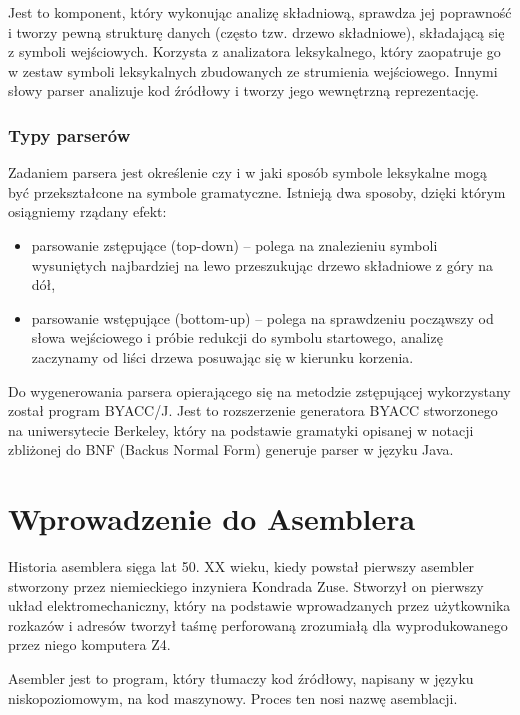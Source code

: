 \documentclass[a4paper,12pt,twoside]{article}
\begin{document}
Jest to komponent, który wykonując analizę składniową, sprawdza jej poprawność i tworzy pewną strukturę danych (często tzw. drzewo składniowe), składającą się z symboli wejściowych. Korzysta z analizatora leksykalnego, który zaopatruje go w zestaw symboli leksykalnych zbudowanych ze strumienia wejściowego. Innymi słowy parser analizuje kod źródłowy i tworzy jego wewnętrzną reprezentację.

\subsubsection{Typy parserów}

Zadaniem parsera jest określenie czy i w jaki sposób symbole leksykalne mogą być przekształcone na symbole gramatyczne. Istnieją dwa sposoby, dzięki którym osiągniemy rządany efekt:
\begin{itemize}
	\item parsowanie zstępujące (top-down) -- polega na znalezieniu symboli wysuniętych najbardziej na lewo przeszukując drzewo składniowe z góry na dół,
	\item parsowanie wstępujące (bottom-up) -- polega na sprawdzeniu począwszy od słowa wejściowego i próbie redukcji do symbolu startowego, analizę zaczynamy od liści drzewa posuwając się w kierunku korzenia.
\end{itemize}

Do wygenerowania parsera opierającego się na metodzie zstępującej wykorzystany został program BYACC/J\cite{byaccj}. Jest to rozszerzenie generatora BYACC stworzonego na uniwersytecie Berkeley\cite{byacc}, który na podstawie gramatyki opisanej w notacji zbliżonej do BNF (Backus Normal Form)\cite{bnf} generuje parser w języku Java.

\newpage

\section{Wprowadzenie do Asemblera}

Historia asemblera sięga lat 50. XX wieku, kiedy powstał pierwszy asembler stworzony przez niemieckiego inzyniera Kondrada Zuse. Stworzył on pierwszy układ elektromechaniczny, który na podstawie wprowadzanych przez użytkownika rozkazów i adresów tworzył taśmę perforowaną zrozumiałą dla wyprodukowanego przez niego komputera Z4.

Asembler jest to program, który tłumaczy kod źródłowy, napisany w języku niskopoziomowym, na kod maszynowy. Proces ten nosi nazwę asemblacji. 
\end{document}
